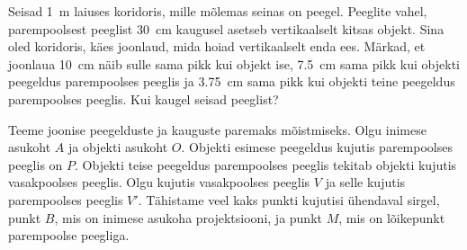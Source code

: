 
Seisad \SI{1}{\m} laiuses koridoris, mille mõlemas seinas on peegel. Peeglite vahel, parempoolsest peeglist \SI{30}{\cm} kaugusel asetseb vertikaalselt kitsas objekt. Sina oled koridoris, käes joonlaud, mida hoiad vertikaalselt enda ees. Märkad, et joonlaua \SI{10}{\cm} näib sulle sama pikk kui objekt ise, \SI{7.5}{\cm} sama pikk kui objekti peegeldus parempoolses peeglis ja \SI{3.75}{\cm} sama pikk kui objekti teine peegeldus parempoolses peeglis. Kui kaugel seisad peeglist?


\hint

\solu
Teeme joonise peegelduste ja kauguste paremaks mõistmiseks. Olgu inimese asukoht $A$ ja objekti asukoht $O$. Objekti esimese peegeldus kujutis parempoolses peeglis on $P$. Objekti teise peegeldus parempoolses peeglis tekitab objekti kujutis vasakpoolses peeglis. Olgu kujutis vasakpoolses peeglis $V$ ja selle kujutis parempoolses peeglis $V'$. Tähistame veel kaks punkti kujutisi ühendaval sirgel, punkt $B$, mis on inimese asukoha projektsiooni, ja punkt $M$, mis on lõikepunkt parempoolse peegliga.

\begin{center}
\end{center}

